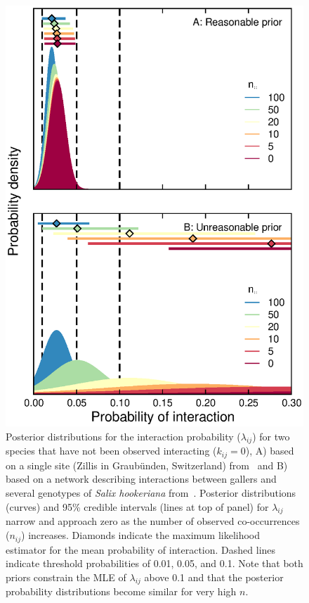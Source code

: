 \documentclass[12pt]{article}
\begin{document}
  \begin{figure}[h!]
    \caption{Posterior distributions for the interaction probability ($\lambda_{ij}$) for two species that have not been observed interacting ($k_{ij}=0$), A) based on a single site (Zillis in Graub\"{u}nden, Switzerland) from~\citet{Kopelke2017} and B) based on a network describing interactions between gallers and several genotypes of \emph{Salix hookeriana} from~\citet{Barbour2016}. Posterior distributions (curves) and 95\% credible intervals (lines at top of panel) for $\lambda_{ij}$ narrow and approach zero as the number of observed co-occurrences ($n_{ij}$) increases. Diamonds indicate the maximum likelihood estimator for the mean probability of interaction.
    Dashed lines indicate threshold probabilities of 0.01, 0.05, and 0.1. Note that both priors constrain the MLE of $\lambda_{ij}$ above 0.1 and that the posterior probability distributions become similar for very high $n$.}
    \label{prior_comparison}
    \begin{center}
    \includegraphics*[width=.8\textwidth]{figures/SG_pdfs_prior_comparison.eps}
    \end{center}
    \end{figure}




\clearpage

     
\end{document}
